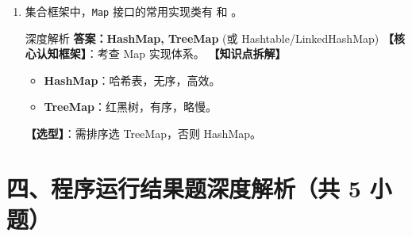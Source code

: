 \documentclass[12pt, a4paper]{ctexart}
\newcommand{\code}[1]{\texttt{#1}}
\newcommand{\blank}{\underline{\hspace{2em}}}
\begin{document}
\begin{enumerate}[label=\textbf{\arabic*.}, itemsep=1em]
    \item 集合框架中，\code{Map} 接口的常用实现类有 \blank 和 \blank。
    \begin{bluebox}{深度解析}
    \textbf{答案：HashMap, TreeMap} (或 Hashtable/LinkedHashMap)
    \textbf{【核心认知框架】}：考查 Map 实现体系。
    \textbf{【知识点拆解】}
    \begin{itemize}[leftmargin=*, nosep]
        \item \textbf{HashMap}：哈希表，无序，高效。
        \item \textbf{TreeMap}：红黑树，有序，略慢。
    \end{itemize}
    \textbf{【选型】}：需排序选 TreeMap，否则 HashMap。
    \end{bluebox}
\end{enumerate}

\section*{四、程序运行结果题深度解析（共 5 小题）}
\end{document}
